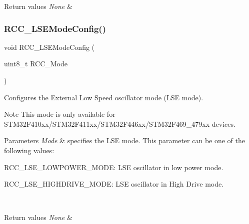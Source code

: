 \begin{DoxyRetVals}{Return values}
{\em None} & \\
\hline
\end{DoxyRetVals}
\mbox{\label{group___r_c_c_gad62e35e5a3289624e00636ff483e5399}} 
\subsubsection{\texorpdfstring{R\+C\+C\+\_\+\+L\+S\+E\+Mode\+Config()}{RCC\_LSEModeConfig()}}
{\footnotesize\ttfamily void R\+C\+C\+\_\+\+L\+S\+E\+Mode\+Config (\begin{DoxyParamCaption}\item[{uint8\+\_\+t}]{R\+C\+C\+\_\+\+Mode }\end{DoxyParamCaption})}



Configures the External Low Speed oscillator mode (L\+SE mode). 

\begin{DoxyNote}{Note}
This mode is only available for S\+T\+M32\+F410xx/\+S\+T\+M32\+F411xx/\+S\+T\+M32\+F446xx/\+S\+T\+M32\+F469\+\_\+479xx devices. 
\end{DoxyNote}

\begin{DoxyParams}{Parameters}
{\em Mode} & specifies the L\+SE mode. This parameter can be one of the following values\+: \begin{DoxyItemize}
\item R\+C\+C\+\_\+\+L\+S\+E\+\_\+\+L\+O\+W\+P\+O\+W\+E\+R\+\_\+\+M\+O\+DE\+: L\+SE oscillator in low power mode. \item R\+C\+C\+\_\+\+L\+S\+E\+\_\+\+H\+I\+G\+H\+D\+R\+I\+V\+E\+\_\+\+M\+O\+DE\+: L\+SE oscillator in High Drive mode. \end{DoxyItemize}
\\
\hline
\end{DoxyParams}

\begin{DoxyRetVals}{Return values}
{\em None} & \\
\hline
\end{DoxyRetVals}
\mbox{\label{group___r_c_c_ga81e3ca29fd154ac2019bba6936d6d5ed}} 
